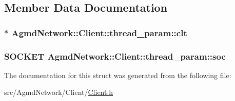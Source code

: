 \subsection{Member Data Documentation}
\hypertarget{struct_agmd_network_1_1_client_1_1thread__param_afdf3dc4843047849eb283a242441c6e0}{
\subsubsection[{clt}]{$\ast$ Agmd\+Network\+::\+Client\+::thread\+\_\+param\+::clt}}\label{struct_agmd_network_1_1_client_1_1thread__param_afdf3dc4843047849eb283a242441c6e0}
\hypertarget{struct_agmd_network_1_1_client_1_1thread__param_a53e4d946c18418fc9a740c052f412ecb}{
\subsubsection[{soc}]{\setlength{\rightskip}{0pt plus 5cm}S\+O\+C\+K\+E\+T Agmd\+Network\+::\+Client\+::thread\+\_\+param\+::soc}}\label{struct_agmd_network_1_1_client_1_1thread__param_a53e4d946c18418fc9a740c052f412ecb}


The documentation for this struct was generated from the following file\+:\begin{DoxyCompactItemize}
\item 
src/\+Agmd\+Network/\+Client/\hyperlink{_client_8h}{Client.\+h}\end{DoxyCompactItemize}
